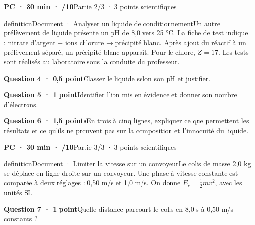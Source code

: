 \textbf{PC · 30 min · /10}\hfill Partie 2/3 · 3 points scientifiques
\begin{pcEncadre}{definition}{Document · Analyser un liquide de conditionnement}Un autre prélèvement de liquide présente un pH de 8,0 vers 25 °C. La fiche de test indique : nitrate d’argent + ions chlorure → précipité blanc. Après ajout du réactif à un prélèvement séparé, un précipité blanc apparaît. Pour le chlore, $Z=17$. Les tests sont réalisés au laboratoire sous la conduite du professeur.\end{pcEncadre}
\par\addvspace{3mm}\noindent\begin{minipage}{\linewidth}\textbf{Question 4 · 0,5 point}\quad Classer le liquide selon son pH et justifier.\par\end{minipage}\par
\par\addvspace{3mm}\noindent\begin{minipage}{\linewidth}\textbf{Question 5 · 1 point}\quad Identifier l’ion mis en évidence et donner son nombre d’électrons.\par\end{minipage}\par
\par\addvspace{3mm}\noindent\begin{minipage}{\linewidth}\textbf{Question 6 · 1,5 points}\quad En trois à cinq lignes, expliquer ce que permettent les résultats et ce qu’ils ne prouvent pas sur la composition et l’innocuité du liquide.\par\end{minipage}\par
\vfill{}
\textbf{PC · 30 min · /10}\hfill Partie 3/3 · 3 points scientifiques
\begin{pcEncadre}{definition}{Document · Limiter la vitesse sur un convoyeur}Le colis de masse 2,0 kg se déplace en ligne droite sur un convoyeur. Une phase à vitesse constante est comparée à deux réglages : 0,50 m/s et 1,0 m/s. On donne $E_c=\frac12mv^2$, avec les unités SI.\end{pcEncadre}
\par\addvspace{3mm}\noindent\begin{minipage}{\linewidth}\textbf{Question 7 · 1 point}\quad Quelle distance parcourt le colis en 8,0 s à 0,50 m/s constants ?\par\end{minipage}\par
